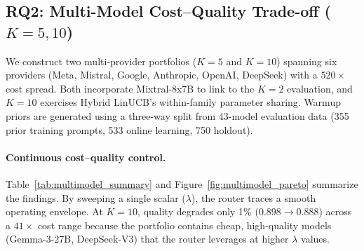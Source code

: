 
\subsection{RQ2: Multi-Model Cost--Quality Trade-off (\texorpdfstring{$K{=}5, 10$}{K=5, 10})}
\label{sec:multimodel}

We construct two multi-provider portfolios ($K{=}5$ and $K{=}10$) spanning six providers (Meta, Mistral, Google, Anthropic, OpenAI, DeepSeek) with a $520\times$ cost spread. Both incorporate Mixtral-8x7B to link to the $K{=}2$ evaluation, and $K{=}10$ exercises Hybrid LinUCB's within-family parameter sharing. Warmup priors are generated using a three-way split from 43-model evaluation data (355 prior training prompts, 533 online learning, 750 holdout).



\paragraph{Continuous cost--quality control.}
Table~\ref{tab:multimodel_summary} and Figure~\ref{fig:multimodel_pareto} summarize the findings. By sweeping a single scalar ($\lambda$), the router traces a smooth operating envelope. At $K{=}10$, quality degrades only 1\% ($0.898 \to 0.888$) across a $41\times$ cost range because the portfolio contains cheap, high-quality models (Gemma-3-27B, DeepSeek-V3) that the router leverages at higher $\lambda$ values.

\begin{table}[htbp]
\centering
\caption{Multi-model routing summary (mean judge agreement). Gap closure is relative to the weakest model. Mean $\pm$ std ($n{=}20$).}
\label{tab:multimodel_summary}
\small
{}
\end{table}

